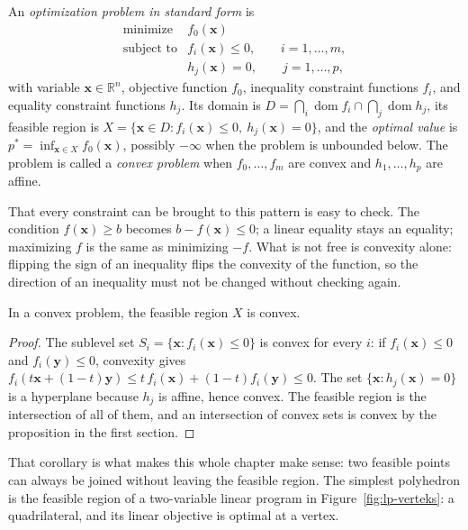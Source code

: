 \begin{definisi}
An \emph{optimization problem in standard form} is
\[
  \begin{array}{ll}
  \text{minimize} & f_{0}(\mathbf{x})\\
  \text{subject to} & f_{i}(\mathbf{x})\le0,\qquad i=1,\dots,m,\\
                & h_{j}(\mathbf{x})=0,\qquad j=1,\dots,p,
  \end{array}
\]
with variable $\mathbf{x}\in\mathbb{R}^{n}$, objective function $f_{0}$, inequality constraint
functions $f_{i}$, and equality constraint functions $h_{j}$. Its domain is
$D=\bigcap_{i}\operatorname{dom}f_{i}\cap\bigcap_{j}\operatorname{dom}h_{j}$, its feasible
region is $X=\{\mathbf{x}\in D:f_{i}(\mathbf{x})\le0,\ h_{j}(\mathbf{x})=0\}$, and the
\emph{optimal value} is $p^{*}=\inf_{\mathbf{x}\in X}f_{0}(\mathbf{x})$, possibly $-\infty$
when the problem is unbounded below. The problem is called a \emph{convex problem} when
$f_{0},\dots,f_{m}$ are convex and $h_{1},\dots,h_{p}$ are affine.
\end{definisi}

That every constraint can be brought to this pattern is easy to check. The condition
$f(\mathbf{x})\ge b$ becomes $b-f(\mathbf{x})\le0$; a linear equality stays an equality;
maximizing $f$ is the same as minimizing $-f$. What is not free is convexity alone: flipping
the sign of an inequality flips the convexity of the function, so the direction of an
inequality must not be changed without checking again.

\begin{akibat}
In a convex problem, the feasible region $X$ is convex.
\end{akibat}

\begin{proof}
The sublevel set $S_{i}=\{\mathbf{x}:f_{i}(\mathbf{x})\le0\}$ is convex for every $i$: if
$f_{i}(\mathbf{x})\le0$ and $f_{i}(\mathbf{y})\le0$, convexity gives
$f_{i}(t\mathbf{x}+(1-t)\mathbf{y})\le t\,f_{i}(\mathbf{x})+(1-t)f_{i}(\mathbf{y})\le0$.
The set $\{\mathbf{x}:h_{j}(\mathbf{x})=0\}$ is a hyperplane because $h_{j}$ is affine, hence
convex. The feasible region is the intersection of all of them, and an intersection of convex
sets is convex by the proposition in the first section.
\end{proof}

That corollary is what makes this whole chapter make sense: two feasible points can always be
joined without leaving the feasible region. The simplest polyhedron is the feasible region of a
two-variable linear program in Figure~\ref{fig:lp-verteks}: a quadrilateral, and its linear
objective is optimal at a vertex.

